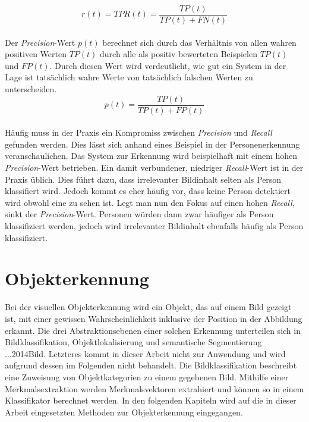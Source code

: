 		\begin{equation}
		r(t)=TPR(t)=\frac{TP(t)}{TP(t)+FN(t)}
		\label{eq: recall}
		\end{equation}\\
		
		Der \textit{Precision}-Wert $p(t)$ berechnet sich durch das Verhältnis von allen wahren positiven Werten $TP(t)$ durch alle als positiv bewerteten Beispielen $TP(t)$ und $FP(t)$. Durch diesen Wert wird verdeutlicht, wie gut ein System in der Lage ist tatsächlich wahre Werte von tatsächlich falschen Werten zu unterscheiden.\\
		
		\begin{equation}
		p(t)=\frac{TP(t)}{TP(t)+FP(t)}
		\label{eq: precision}
		\end{equation}\\
		
		Häufig muss in der Praxis ein Kompromiss zwischen \textit{Precision} und \textit{Recall} gefunden werden. Dies lässt sich anhand eines Beispiel in der Personenerkennung veranschaulichen. Das System zur Erkennung wird beispielhaft mit einem hohen \textit{Precision}-Wert betrieben. Ein damit verbundener, niedriger \textit{Recall}-Wert ist in der Praxis üblich. Dies führt dazu, dass irrelevanter Bildinhalt selten als Person klassifiert wird. Jedoch kommt es eher häufig vor, dass keine Person detektiert wird obwohl eine zu sehen ist. Legt man nun den Fokus auf einen hohen \textit{Recall}, sinkt der \textit{Precision}-Wert. Personen würden dann zwar häufiger als Person klassifiziert werden, jedoch wird irrelevanter Bildinhalt ebenfalls häufig als Person klassifiziert.
		
		
		
		
		
		
	\section{Objekterkennung}
	\label{sec: Mecanumräder}
	Bei der visuellen Objekterkennung wird ein Objekt, das auf einem Bild gezeigt ist, mit einer gewissen Wahrscheinlichkeit inklusive der Position in der Abbildung erkannt. Die drei Abstraktionsebenen einer solchen Erkennung unterteilen sich in Bildklassifikation, Objektlokalisierung und semantische Segmentierung ...2014Bild. Letzteres kommt in dieser Arbeit nicht zur Anwendung und wird aufgrund dessen im Folgenden nicht behandelt. Die Bildklassifikation beschreibt eine Zuweisung von Objektkategorien zu einem gegebenen Bild. Mithilfe einer Merkmalsextraktion werden Merkmalsvektoren extrahiert und können so in einem Klassifikator berechnet werden. In den folgenden Kapiteln wird auf die in dieser Arbeit eingesetzten Methoden zur Objekterkennung eingegangen. 
	
